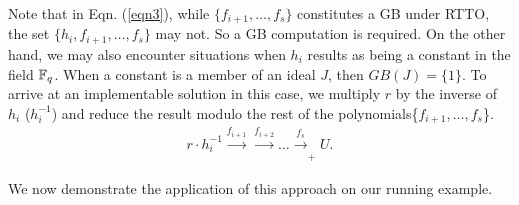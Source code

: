 Note that in Eqn. (\ref{eqn3}), while $\{f_{i+1},\dots,f_s\}$
constitutes a GB under RTTO, the set $\{h_i,f_{i+1},\dots,f_s\}$
may not. So a GB computation is required. On the other hand, we
may also encounter situations when $h_i$ results as being a constant
in the field ${\mathbb{F}}_{q}$. When a constant is a member of an ideal $J$, then
$GB(J) = \{1\}$. To arrive at an implementable solution in this case,
we multiply $r$ by the inverse of $h_i$ ($h_i^{-1}$) and reduce the
result modulo the rest of the polynomials\{$f_{i+1},\dots,f_s$\}.  
\vspace{-0.1in}
\begin{align}
r\cdot h_i^{-1}\xrightarrow[]{f_{i+1}}\xrightarrow[]{f_{i+2}}\dots\xrightarrow[]{f_s}_+U.
\end{align}

We now demonstrate the application of this approach on our running
example.

